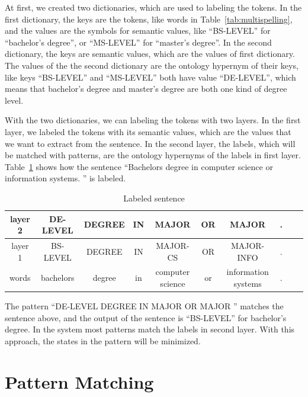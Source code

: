 At first, we created two dictionaries, which are used to labeling the tokens. In the first dictionary, the keys are the tokens, like words in Table~\ref{tab:multispelling}, and the values are the symbols for semantic values, like ``BS-LEVEL'' for ``bachelor's degree'', or ``MS-LEVEL'' for ``master's degree''. In the second dictionary, the keys are semantic values, which are the values of first dictionary. The values of the the second dictionary are the ontology hypernym of their keys, like keys ``BS-LEVEL'' and  ``MS-LEVEL'' both have value ``DE-LEVEL'', which means that bachelor's degree and master's degree are both one kind of degree level.

With the two dictionaries, we can labeling the tokens with two layers. In the first layer, we labeled the tokens with its semantic values, which are the values that we want to extract from the sentence. In the second layer, the labels, which will be matched with patterns, are the ontology hypernyms of the labels in first layer. Table~\ref{tab:labeldsent} shows how the sentence ``Bachelors  degree  in computer science or information systems. '' is labeled.

\begin{table}[ht]
\caption{Labeled sentence } %
\centering %
\begin{tabular}{  | c | c | c | c | c |c | c |c | c | c |  }
 \hline
 layer 2 & DE-LEVEL   & DEGREE & IN & MAJOR            & OR & MAJOR  &.  \\
 \hline
 layer 1 &  BS-LEVEL   & DEGREE & IN & MAJOR-CS         & OR & MAJOR-INFO & .      \\
 \hline
   words & bachelors   & degree & in & computer science & or & information systems & .     \\
  \hline
\end{tabular}
\label{tab:labeldsent} %
\end{table}

The pattern ``DE-LEVEL DEGREE  IN   MAJOR  OR  MAJOR ''  matches the sentence above, and the output of the sentence is ``BS-LEVEL'' for bachelor's degree. In the system most patterns match the labels in second layer. With this approach, the states in the pattern will be minimized.

\section{Pattern Matching}

